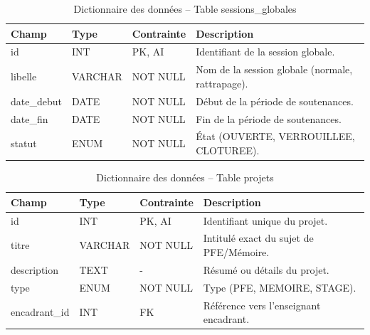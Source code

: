 \documentclass[12pt,a4paper]{article}
\begin{document}
\begin{table}[H]
    \centering
    \small
    \begin{tabular}{lp{2cm}lp{6cm}}
        \toprule
        \rowcolor{primary!10}
        \textbf{Champ} & \textbf{Type} & \textbf{Contrainte} & \textbf{Description}                            \\
        \midrule
        id             & INT           & PK, AI              & Identifiant de la session globale.              \\
        libelle        & VARCHAR       & NOT NULL            & Nom de la session globale (normale, rattrapage). \\
        date\_debut    & DATE          & NOT NULL            & Début de la période de soutenances.             \\
        date\_fin      & DATE          & NOT NULL            & Fin de la période de soutenances.               \\
        statut         & ENUM          & NOT NULL            & État (OUVERTE, VERROUILLEE, CLOTUREE).          \\
        \bottomrule
    \end{tabular}
    \caption{Dictionnaire des données -- Table sessions\_globales}
\end{table}

\begin{table}[H]
    \centering
    \small
    \begin{tabular}{lp{2cm}lp{6cm}}
        \toprule
        \rowcolor{primary!10}
        \textbf{Champ} & \textbf{Type} & \textbf{Contrainte} & \textbf{Description}                    \\
        \midrule
        id             & INT           & PK, AI              & Identifiant unique du projet.           \\
        titre          & VARCHAR       & NOT NULL            & Intitulé exact du sujet de PFE/Mémoire. \\
        description    & TEXT          & -                   & Résumé ou détails du projet.            \\
        type           & ENUM          & NOT NULL            & Type (PFE, MEMOIRE, STAGE).             \\
        encadrant\_id  & INT           & FK                  & Référence vers l'enseignant encadrant.  \\
        \bottomrule
    \end{tabular}
    \caption{Dictionnaire des données -- Table projets}
\end{table}
\end{document}
